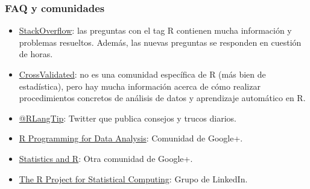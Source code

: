 \documentclass{beamer}
\begin{document}
\begin{frame}
\frametitle{FAQ y comunidades}
\begin{itemize}
\item \href{http://stackoverflow.com/questions/tagged/r}{StackOverflow}: las preguntas con el tag R contienen mucha información y problemas resueltos. Además, las nuevas preguntas se responden en cuestión de horas.

\item \href{http://stats.stackexchange.com/}{CrossValidated}: no es una comunidad específica de R (más bien de estadística), pero hay mucha información acerca de cómo realizar procedimientos concretos de análisis de datos y aprendizaje automático en R.

\item \href{https://twitter.com/RLangTip}{@RLangTip}: Twitter que publica consejos y trucos diarios.

\item \href{https://plus.google.com/u/0/communities/115516770321395255377}{R Programming for Data Analysis}: Comunidad de Google+.
\item \href{https://plus.google.com/u/0/communities/117681470673972651781}{Statistics and R}: Otra comunidad de Google+.
\item \href{https://www.linkedin.com/grp/home?gid=77616}{The R Project for Statistical Computing}: Grupo de LinkedIn.
\end{itemize}
\end{frame}
\end{document}
